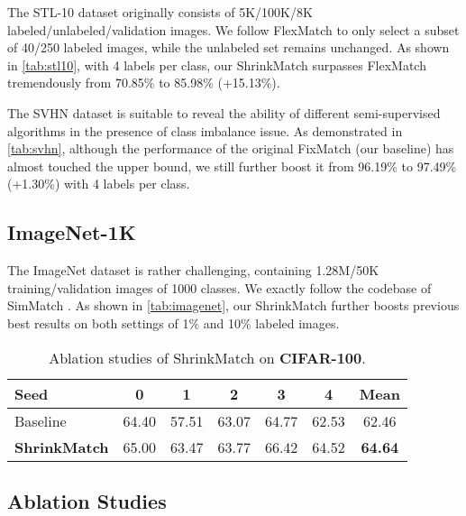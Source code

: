 \documentclass[10pt,twocolumn,letterpaper]{article}
\begin{document}
The STL-10 dataset originally consists of 5K/100K/8K labeled/unlabeled/validation images. We follow FlexMatch to only select a subset of 40/250 labeled images, while the unlabeled set remains unchanged. As shown in \cref{tab:stl10}, with 4 labels per class, our ShrinkMatch surpasses FlexMatch tremendously from 70.85\% to 85.98\% (+15.13\%).

The SVHN dataset is suitable to reveal the ability of different semi-supervised algorithms in the presence of class imbalance issue. As demonstrated in \cref{tab:svhn}, although the performance of the original FixMatch (our baseline) has almost touched the upper bound, we still further boost it from 96.19\% to 97.49\% (+1.30\%) with 4 labels per class.

\subsection{ImageNet-1K}

The ImageNet dataset is rather challenging, containing 1.28M/50K training/validation images of 1000 classes. We exactly follow the codebase of SimMatch \cite{simmatch}. As shown in \cref{tab:imagenet}, our ShrinkMatch further boosts previous best results on both settings of 1\% and 10\% labeled images.


\begin{table}[t]
\centering
\small
\setlength\tabcolsep{1.5mm}
    \centering
    \begin{tabular}{l|ccccc|c}
    \toprule
    
    Seed & 0 & 1 & 2 & 3 & 4 & Mean \\
    
    \midrule
    
    Baseline & 64.40 & 57.51 & 63.07 & 64.77 & 62.53 & 62.46 \\
    
    \textbf{ShrinkMatch} & 65.00 & 63.47 & 63.77 & 66.42 & 64.52 & \textbf{64.64} \\
    
    \bottomrule

    \end{tabular}
    \vspace{-1mm}
    \caption{Ablation studies of ShrinkMatch on \textbf{CIFAR-100}.}
    \vspace{-2mm}
    \label{tab:ablation_shrinkmatch_cifar100}
\end{table} 

\subsection{Ablation Studies}
\end{document}
